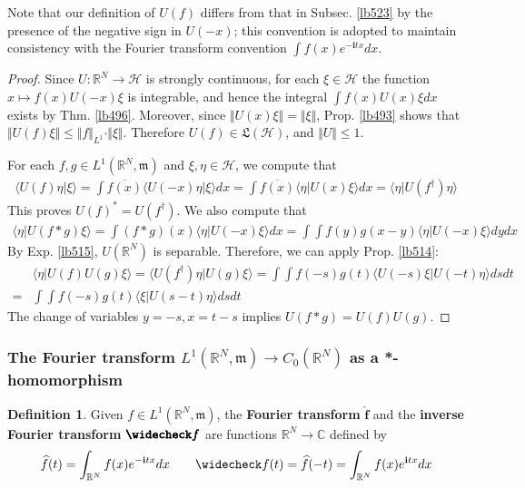 \documentclass[12pt,b5paper,notitlepage]{article}
\theoremstyle{definition}
\newtheorem{df}{Definition}[subsection]
\theoremstyle{plain}
\newcommand{\fk}{\mathfrak}
\newcommand{\wht}{\widehat}
\newcommand{\wch}{\widecheck}
\newcommand{\ovl}{\overline}
\newcommand{\bk}[1]{\langle {#1}\rangle}
\newcommand{\im}{\mathbf{i}}
\newcommand{\Cbb}{\mathbb C}
\newcommand{\Rbb}{\mathbb R}
\newcommand{\mk}{\mathfrak m}
\newcommand{\MH}{\mathcal H}
\numberwithin{equation}{section}
\begin{document}
Note that our definition of $U(f)$ differs from that in Subsec. \ref{lb523} by the presence of the negative sign in $U(-x)$; this convention is adopted to maintain consistency with the Fourier transform convention $\int f(x)e^{-\im tx}dx$.


\begin{proof}
Since $U:\Rbb^N\rightarrow\MH$ is strongly continuous, for each $\xi\in\MH$ the function $x\mapsto f(x)U(-x)\xi$ is integrable, and hence the integral $\int f(x)U(x)\xi dx$ exists by Thm. \ref{lb496}. Moreover, since $\Vert U(x)\xi\Vert=\Vert \xi\Vert$, Prop. \ref{lb493} shows that $\Vert U(f)\xi\Vert\leq \Vert f\Vert_{L^1}\cdot\Vert \xi\Vert$. Therefore $U(f)\in\fk L(\MH)$, and $\Vert U\Vert\leq 1$. 

For each $f,g\in L^1(\Rbb^N,\mk)$ and $\xi,\eta\in\MH$, we compute that
\begin{align*}
\bk{U(f)\eta|\xi}=\int \ovl{f(x)}\bk{U(-x)\eta|\xi}dx=\int\ovl{f(x)}\bk{\eta|U(x)\xi}dx=\bk{\eta|U(f^\dagger)\eta}
\end{align*}
This proves $U(f)^*=U(f^\dagger)$. We also compute that
\begin{align*}
\bk{\eta|U(f*g)\xi}=\int (f*g)(x)\bk{\eta|U(-x)\xi} dx=\int\int f(y)g(x-y)\bk{\eta|U(-x)\xi}dydx
\end{align*}
By Exp. \ref{lb515}, $U(\Rbb^N)$ is separable. Therefore, we can apply Prop. \ref{lb514}:
\begin{align*}
&\bk{\eta|U(f)U(g)\xi}=\bk{U(f^\dagger)\eta|U(g)\xi}=\int\int f(-s)g(t)\bk{U(-s)\xi|U(-t)\eta}dsdt\\
=&\int\int f(-s)g(t)\bk{\xi|U(s-t)\eta}dsdt
\end{align*}
The change of variables $y=-s,x=t-s$ implies $U(f*g)=U(f)U(g)$.
\end{proof}







\subsubsection{The Fourier transform $L^1(\Rbb^N,\mk)\rightarrow C_0(\Rbb^N)$ as a *-homomorphism}




\begin{df}
Given $f\in L^1(\Rbb^N,\mk)$, the \textbf{Fourier transform}  $\pmb{\wht f}$ and the \textbf{inverse Fourier transform}  $\pmb{\wch f}$ are functions $\Rbb^N\rightarrow\Cbb$ defined by
\begin{gather*}
\wht f(t)=\int_{\Rbb^N}f(x)e^{-\im tx}dx\qquad \wch f(t)=\wht f(-t)=\int_{\Rbb^N}f(x)e^{\im tx}dx
\end{gather*}
\end{df}
\end{document}
